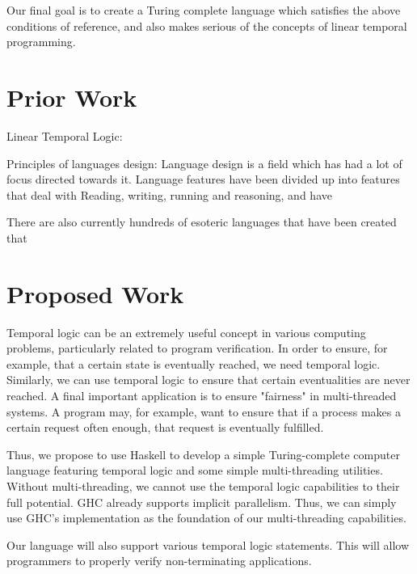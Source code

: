 \documentclass[numbers]{sigplanconf}
\begin{document}
Our final goal is to create a Turing complete language which satisfies
the above conditions of reference, and also makes serious of the
concepts of linear temporal programming.

\section{Prior Work}

Linear Temporal Logic:


Principles of languages design:
Language design is a field which has had a lot of focus directed
towards it. Language features have been divided up into features that
deal with Reading, writing, running and reasoning, and have 

There are also currently hundreds of esoteric languages that
have been created that 



\section{Proposed Work}
Temporal logic can be an extremely useful concept in various computing problems, particularly related to program verification. In order to ensure, for example, that a certain state is eventually reached, we need temporal logic. Similarly, we can use temporal logic to ensure that certain eventualities are never reached. A final important application is to ensure "fairness" in multi-threaded systems. A program may, for example, want to ensure that if a process makes a certain request often enough, that request is eventually fulfilled.

Thus, we propose to use Haskell to develop a simple Turing-complete computer language featuring temporal logic and some simple multi-threading utilities. Without multi-threading, we cannot use the temporal logic capabilities to their full potential. GHC already supports implicit parallelism. Thus, we can simply use GHC's implementation as the foundation of our multi-threading capabilities. 

Our language will also support various temporal logic statements. This will allow programmers to properly verify non-terminating applications. 
\end{document}
